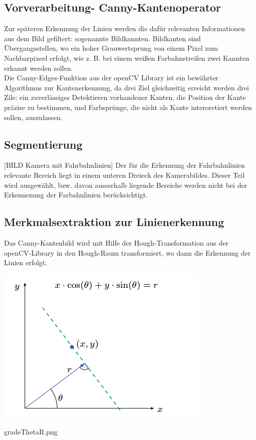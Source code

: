 \subsection{Vorverarbeitung- Canny-Kantenoperator}
Zur späteren Erkennung der Linien werden die dafür relevanten Informationen aus
dem Bild gefiltert: sogenannte Bildkannten. Bildkanten sind Übergangsstellen, wo
ein hoher Grauwertsprung von einem Pixel zum Nachbarpixeel erfolgt, wie z. B. bei 
einem weißen Farbahnstreifen zwei Kannten erkannt werden sollen.\\
Die Canny-Edges-Funktion aus der openCV Library ist ein bewährter Algorithmus zur Kantenerkennung, da drei Ziel
gleichzeitig erreicht werden drei Zile: ein zuverlässiges Detektieren
vorhandener Kanten, die Position der Kante präzise zu bestimmen, und Farbsprünge, 
die nicht als Kante interoretiert werden sollen, auszulassen.\\

\subsection{Segmentierung}
[BILD Kamera mit Fahrbahnlinien]
Der für die Erkennung der Fahrbahnlinien relevante Bereich liegt in einem
unteren Dreieck des Kamerabildes. Dieser Teil wird ausgewählt, bzw. davon ausserhalb
liegende Bereiche werden nicht bei der Erkennenung der Farbahnlinien
berücksichtigt.\\

\subsection{Merkmalsextraktion zur Linienerkennung}
Das Canny-Kantenbild wird mit Hilfe der Hough-Transformation aus der
openCV-Library in den Hough-Raum transformiert, wo dann die Erkennung der Linien
erfolgt.

\begin{minipage}{\columnwidth}
  \makeatletter
  \def\@captype{figure}
  \makeatother
  \centering
  \includegraphics[width=0.8\linewidth]{images/gradeThetaR.png}
  \caption{gradeThetaR.png}
  \label{fig:gradeThetaR}
\end{minipage}

